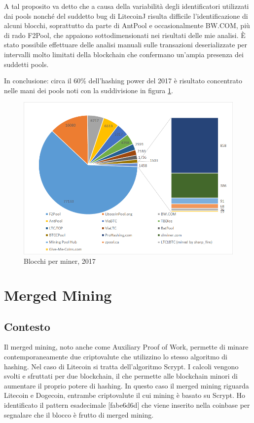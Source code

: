 A tal proposito va detto che a causa della variabilità degli identificatori utilizzati dai pools nonché del suddetto bug di LitecoinJ risulta difficile l’identificazione di alcuni blocchi, soprattutto da parte di AntPool e occasionalmente BW.COM, più di rado F2Pool, che appaiono sottodimensionati nei risultati delle mie analisi. È stato possibile effettuare delle analisi manuali sulle transazioni deserializzate per intervalli molto limitati della blockchain che confermano un’ampia presenza dei suddetti pools.

In conclusione: circa il 60\% dell’hashing power del 2017 è risultato concentrato nelle mani dei pools noti con la suddivisione in figura \ref{fig:distribuzionemining}.

\begin{figure}[h!]
	\centering
	\includegraphics[width=1.0\linewidth]{images/distribuzionemining}
	\caption{Blocchi per miner, 2017}
	\label{fig:distribuzionemining}
\end{figure}


\section{Merged Mining}
\subsection{Contesto}
Il merged mining, noto anche come Auxiliary Proof of Work, permette di minare contemporaneamente due criptovalute che utilizzino lo stesso algoritmo di hashing.\cite{mmcoincentral} Nel caso di Litecoin si tratta dell'algoritmo Scrypt.
I calcoli vengono svolti e sfruttati per due blockchain, il che permette alle blockchain minori di aumentare il proprio potere di hashing. In questo caso il merged mining riguarda Litecoin e Dogecoin, entrambe criptovalute il cui mining è basato su Scrypt.
Ho identificato il pattern esadecimale [fabe6d6d] che viene inserito nella coinbase per segnalare che il blocco è frutto di merged mining.

